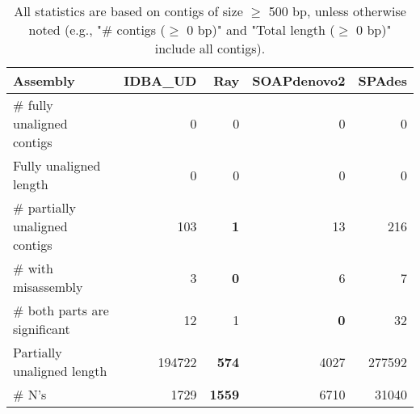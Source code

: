 \documentclass[12pt,a4paper]{article}
\begin{document}
\begin{table}[ht]
\begin{center}
\caption{All statistics are based on contigs of size $\geq$ 500 bp, unless otherwise noted (e.g., "\# contigs ($\geq$ 0 bp)" and "Total length ($\geq$ 0 bp)" include all contigs).}
\begin{tabular}{|l*{4}{|r}|}
\hline
Assembly & IDBA\_UD & Ray & SOAPdenovo2 & SPAdes \\ \hline
\# fully unaligned contigs & 0 & 0 & 0 & 0 \\ \hline
Fully unaligned length & 0 & 0 & 0 & 0 \\ \hline
\# partially unaligned contigs & 103 & {\bf 1} & 13 & 216 \\ \hline
\hspace{5mm}\# with misassembly & 3 & {\bf 0} & 6 & 7 \\ \hline
\hspace{5mm}\# both parts are significant & 12 & 1 & {\bf 0} & 32 \\ \hline
Partially unaligned length & 194722 & {\bf 574} & 4027 & 277592 \\ \hline
\# N's & 1729 & {\bf 1559} & 6710 & 31040 \\ \hline
\end{tabular}
\end{center}
\end{table}
\end{document}
